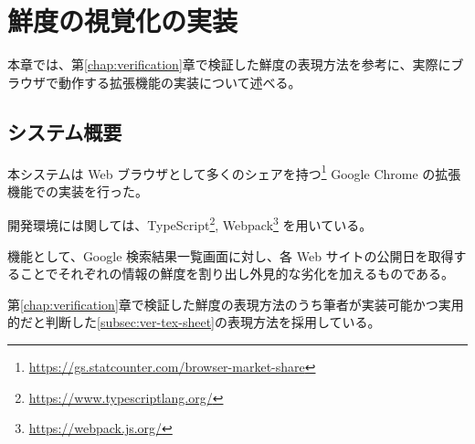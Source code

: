 \chapter{鮮度の視覚化の実装}
\label{chap:implementation}

本章では、第\ref{chap:verification}章で検証した鮮度の表現方法を参考に、実際にブラウザで動作する拡張機能の実装について述べる。

\newpage

\section{システム概要}
\label{sec:imp_system}

本システムは Web ブラウザとして多くのシェアを持つ\footnote{\url{https://gs.statcounter.com/browser-market-share}} Google Chrome の拡張機能での実装を行った。

開発環境には関しては、TypeScript\footnote{\url{https://www.typescriptlang.org/}}, Webpack\footnote{\url{https://webpack.js.org/}} を用いている。

機能として、Google 検索結果一覧画面に対し、各 Web サイトの公開日を取得することでそれぞれの情報の鮮度を割り出し外見的な劣化を加えるものである。

第\ref{chap:verification}章で検証した鮮度の表現方法のうち筆者が実装可能かつ実用的だと判断した\ref{subsec:ver-tex-sheet}の表現方法を採用している。

